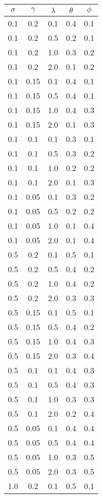 \begin{table}[ht]
\centering
\begin{tabular}{c|c|c|c|c}
\hline
$\sigma$ & $\gamma$ & $\lambda$ & $\theta$ & $\phi$\\
\hline
0.1 & 0.2 & 0.1 & 0.4 & 0.1 \\
0.1 & 0.2 & 0.5 & 0.2 & 0.1 \\
0.1 & 0.2 & 1.0 & 0.3 & 0.2 \\
0.1 & 0.2 & 2.0 & 0.1 & 0.2 \\
0.1 & 0.15 & 0.1 & 0.4 & 0.1 \\
0.1 & 0.15 & 0.5 & 0.4 & 0.1 \\
0.1 & 0.15 & 1.0 & 0.4 & 0.3 \\
0.1 & 0.15 & 2.0 & 0.1 & 0.3 \\
0.1 & 0.1 & 0.1 & 0.3 & 0.1 \\
0.1 & 0.1 & 0.5 & 0.3 & 0.2 \\
0.1 & 0.1 & 1.0 & 0.2 & 0.2 \\
0.1 & 0.1 & 2.0 & 0.1 & 0.3 \\
0.1 & 0.05 & 0.1 & 0.3 & 0.2 \\
0.1 & 0.05 & 0.5 & 0.2 & 0.2 \\
0.1 & 0.05 & 1.0 & 0.1 & 0.4 \\
0.1 & 0.05 & 2.0 & 0.1 & 0.4 \\
0.5 & 0.2 & 0.1 & 0.5 & 0.1 \\
0.5 & 0.2 & 0.5 & 0.4 & 0.2 \\
0.5 & 0.2 & 1.0 & 0.4 & 0.2 \\
0.5 & 0.2 & 2.0 & 0.3 & 0.3 \\
0.5 & 0.15 & 0.1 & 0.5 & 0.1 \\
0.5 & 0.15 & 0.5 & 0.4 & 0.2 \\
0.5 & 0.15 & 1.0 & 0.4 & 0.3 \\
0.5 & 0.15 & 2.0 & 0.3 & 0.4 \\
0.5 & 0.1 & 0.1 & 0.4 & 0.3 \\
0.5 & 0.1 & 0.5 & 0.4 & 0.3 \\
0.5 & 0.1 & 1.0 & 0.3 & 0.3 \\
0.5 & 0.1 & 2.0 & 0.2 & 0.4 \\
0.5 & 0.05 & 0.1 & 0.4 & 0.4 \\
0.5 & 0.05 & 0.5 & 0.4 & 0.4 \\
0.5 & 0.05 & 1.0 & 0.3 & 0.5 \\
0.5 & 0.05 & 2.0 & 0.3 & 0.5 \\
1.0 & 0.2 & 0.1 & 0.5 & 0.1 \\

\end{tabular}
\end{table}
